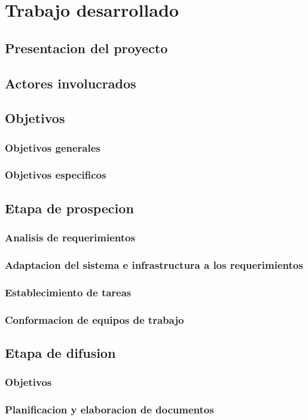 \chapter{Trabajo desarrollado}
\section{Presentacion del proyecto}
\section{Actores involucrados}
\section{Objetivos}
\subsection{Objetivos generales}
\subsection{Objetivos especificos}
\section{Etapa de prospecion}
\subsection{Analisis de requerimientos}
\subsection{Adaptacion del sistema e infrastructura a los requerimientos}
\subsection{Establecimiento de tareas}
\subsection{Conformacion de equipos de trabajo}
\section{Etapa de difusion}
\subsection{Objetivos}
\subsection{Planificacion y elaboracion de documentos}
